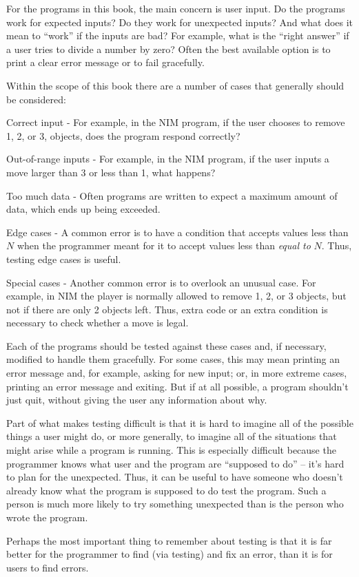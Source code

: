 For the programs in this book, the main concern is user input.  Do the programs  work for expected inputs?  Do they work for unexpected inputs?  And what does it mean to ``work'' if the inputs are bad?  For example, what is the ``right answer'' if a user tries to divide a number by zero?  Often the best available option is to print a clear error message or to fail gracefully.  

Within the scope of this book there are a number of cases that generally should be considered:
\begin{tight_itemize}
\item Correct input - For example, in the NIM program, if the user chooses to remove 1, 2, or 3, objects, does the program respond correctly?
\item Out-of-range inputs - For example, in the NIM program, if the user inputs a move larger than 3 or less than 1, what happens? 
\item Too much data - Often programs are written to expect a maximum amount of data, which ends up being exceeded.
\item Edge cases - A common error is to have a condition that accepts values less than $N$ when the programmer meant for it to accept values less than \emph{equal to} $N$.  Thus, testing edge cases is useful.
\item Special cases - Another common error is to overlook an unusual case.  For example, in NIM the player is normally allowed to remove 1, 2, or 3 objects, but not if there are only 2 objects left.  Thus, extra code or an extra condition is necessary to check whether a move is legal.
\end{tight_itemize}
Each of the programs should be tested against these cases and, if necessary, modified to handle them gracefully.  For some cases, this may mean printing an error message and, for example, asking for new input; or, in more extreme cases, printing an error message and exiting.     But if at all possible, a program shouldn't just quit, without giving the user any information about why.

Part of what makes testing difficult is that it is hard to imagine all of the possible things a user might do, or more generally, to imagine all of the situations that might arise while a program is running.  This is especially difficult because the programmer knows what user and the program are ``supposed to do'' -- it's hard to plan for the unexpected.  Thus, it can be useful to have someone who doesn't already know what the program is supposed to do test the program.  Such a person is much more likely to try something unexpected than is the person who wrote the program.

Perhaps the most important thing to remember about testing is that it is far better for the programmer to find (via testing) and fix an error, than it is for users to find errors.  

